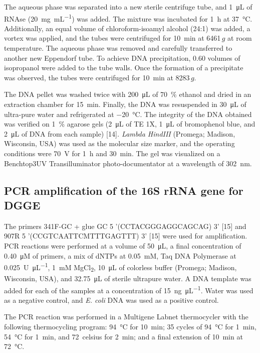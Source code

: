 \documentclass{univsciauth}
\begin{document}
The aqueous phase was separated into a new sterile centrifuge tube, and
\SI{1}{\micro\liter} of RNAse (\SI{20}{mg.mL^{-1}}) was added. The mixture was incubated for \SI{1}{h} at
\SI{37}{\celsius}. Additionally, an equal volume of chloroform-isoamyl alcohol
(24:1) was added, a vortex was applied, and the tubes were centrifuged
for \SI{10}{min} at 6461\,$g$ at room temperature. The aqueous phase was
removed and carefully transferred to another new Eppendorf tube. To
achieve DNA precipitation, 0.60 volumes of isopropanol were added to the
tube walls. Once the formation of a precipitate was observed, the tubes
were centrifuged for \SI{10}{min} at 8283\,$g$.

The DNA pellet was washed twice with \SI{200}{\micro\liter} of \SI{70}{\%} ethanol and dried
in an extraction chamber for \SI{15}{min}. Finally, the DNA was resuspended in
\SI{30}{\micro\liter} of ultra-pure water and refrigerated at \SI{-20}{\celsius}. The integrity of
the DNA obtained was verified on \SI{1}{\%} agarose gels (\SI{2}{\micro\liter} of TE 1X, \SI{1}{\micro\liter}
of bromophenol blue, and \SI{2}{\micro\liter} of DNA from each sample) {[}14{]}\emph{.
Lambda HindIII} (Promega; Madison, Wisconsin, USA) was used as the
molecular size marker, and the operating conditions were \SI{70}{V} for \SI{1}{h}
and \SI{30}{min}. The gel was visualized on a Benchtop3UV Transilluminator
photo-documentator at a wavelength of \SI{302}{nm}.

\subsection{PCR amplification of the 16S rRNA gene for DGGE}

The primers 341F-GC + glue GC 5 '(CCTACGGGAGGCAGCAG) 3' {[}15{]} and
907R 5 '(CCGTCAATTCMTTTGAGTTT) 3' {[}15{]} were used for amplification.
PCR reactions were performed at a volume of \SI{50}{\micro\liter}, a final concentration
of \SI{0.40}{\micro M} of primers, a mix of dNTPs at \SI{0.05}{mM}, Taq DNA Polymerase at
\SI{0.025}{U.\micro L^{-1}}, \SI{1}{mM} MgCl\textsubscript{2}, \SI{10}{\micro\liter} of colorless buffer
(Promega; Madison, Wisconsin, USA), and \SI{32.75}{\micro\liter} of sterile ultrapure
water. A DNA template was added for each of the samples at a
concentration of \SI{15}{ng.\micro L^{-1}}. Water was used as a negative control, and
\emph{E. coli} DNA was used as a positive control.

The PCR reaction was performed in a Multigene Labnet thermocycler with
the following thermocycling program: \SI{94}{\celsius} for \SI{10}{min}; 35 cycles of 
\SI{94}{\celsius} for \SI{1}{min}, \SI{54}{\celsius} for \SI{1}{min},
and \SI{72}{celsius} for \SI{2}{min}; and a final
extension of \SI{10}{min} at \SI{72}{\celsius}.
\end{document}
